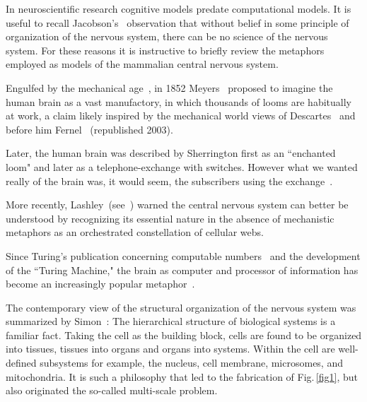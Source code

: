 \documentclass[10pt,letterpaper]{article}
\begin{document}
In neuroscientific research cognitive models predate computational models.
It is useful to recall Jacobson's~\cite{jacobson93} observation that without belief in some principle of organization of the nervous system, there can be no science of the nervous system.
For these reasons it is instructive to briefly review the metaphors employed as models of the mammalian central nervous system. 

Engulfed by the mechanical age~\cite{carlyle52}, in 1852 Meyers~\cite{meyers87} proposed to imagine the human brain as a vast manufactory, in which thousands of looms are habitually at work, a claim likely inspired by the mechanical world views of Descartes~\cite{descartes62} and before him Fernel~\cite{fernel67} (republished 2003).

Later, the human brain was described by Sherrington first as an ``enchanted loom" and later as a telephone-exchange with switches.  However what we wanted really of the brain was, it would seem, the subscribers using the exchange~\cite{sherrington53}.

More recently, Lashley~(see~\cite{jorgensen21}) warned the central nervous system can better be understood by recognizing its essential nature in the absence of mechanistic metaphors as an orchestrated constellation of cellular webs.

Since Turing's publication concerning computable numbers~\cite{turing38} and the development of the ``Turing Machine," the brain as computer and processor of information has become an increasingly popular metaphor~\cite{matassi23}.

The contemporary view of the structural organization of the nervous system was summarized by Simon~\cite{simon96a}: The hierarchical structure of biological systems is a familiar fact. Taking the cell as the building block, cells are found to be organized into tissues, tissues into organs and organs into systems. Within the cell are well-defined subsystems for example, the nucleus, cell membrane, microsomes, and mitochondria. It is such a philosophy that led to the fabrication of Fig.\,\ref{fig1}, but also originated the so-called multi-scale problem.
\end{document}
